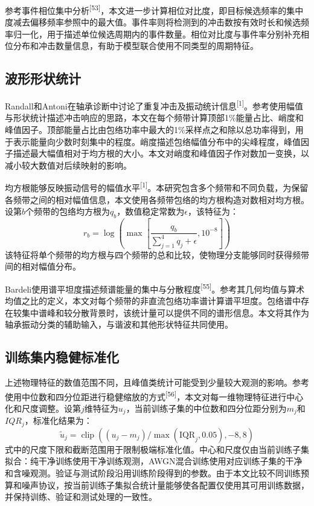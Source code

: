\documentclass[UTF8,12pt,openany,twoside]{ctexbook}
\numberwithin{equation}{chapter}
\begin{document}
参考事件相位集中分析\textsuperscript{[53]}，本文进一步计算相位对比度，即目标候选频率的集中度减去偏移频率参照中的最大值。事件率则将检测到的冲击数按有效时长和候选频率归一化，用于描述单位候选周期内的事件数量。相位对比度与事件率分别补充相位分布和冲击数量信息，有助于模型联合使用不同类型的周期特征。

\subsection{波形形状统计}\label{ux6ce2ux5f62ux5f62ux72b6ux7edfux8ba1}


Randall和Antoni在轴承诊断中讨论了重复冲击及振动统计信息\textsuperscript{[1]}。参考使用幅值与形状统计描述冲击响应的思路，本文在每个频带计算顶部1\%能量占比、峭度和峰值因子。顶部能量占比由包络功率中最大的1\%采样点之和除以总功率得到，用于表示能量向少数时刻集中的程度。峭度描述包络幅值分布中的尖峰程度，峰值因子描述最大幅值相对于均方根的大小。本文对峭度和峰值因子作对数加一变换，以减小较大数值对后续映射的影响。

均方根能够反映振动信号的幅值水平\textsuperscript{[1]}。本研究包含多个频带和不同负载，为保留各频带之间的相对幅值信息，本文使用各频带包络的均方根构造对数相对均方根。设第$b$个频带的包络均方根为$q_b$，数值稳定常数为$\epsilon$，该特征为：
\begin{equation}
\label{eq:auto07}
r_b=\log\!\left(\max\!\left[\frac{q_b}{\sum_{j=1}^{4}q_j+\epsilon},10^{-8}\right]\right)
\end{equation}
该特征将单个频带的均方根与四个频带的总和比较，使物理分支能够同时获得频带间的相对幅值分布。

Bardeli使用谱平坦度描述频谱能量的集中与分散程度\textsuperscript{[55]}。参考其几何均值与算术均值之比的定义，本文对每个频带的非直流包络功率谱计算谱平坦度。包络谱中存在较集中谱峰和较分散背景时，该统计量可以提供不同的谱形信息。本文将其作为轴承振动分类的辅助输入，与谐波和其他形状特征共同使用。

\subsection{训练集内稳健标准化}\label{ux8badux7ec3ux96c6ux5185ux7a33ux5065ux6807ux51c6ux5316}


上述物理特征的数值范围不同，且峰值类统计可能受到少量较大观测的影响。参考使用中位数和四分位距进行稳健缩放的方式\textsuperscript{[56]}，本文对每一维物理特征进行中心化和尺度调整。设第$j$维特征为$u_j$，当前训练子集的中位数和四分位距分别为$m_j$和$IQR_j$，标准化结果为：
\begin{equation}
\label{eq:auto08}
\tilde u_j=\operatorname{clip}\left((u_j-m_j)/\max(\mathrm{IQR}_j,0.05),-8,8\right)
\end{equation}
式中的尺度下限和截断范围用于限制极端标准化值。中心和尺度仅由当前训练子集拟合：纯干净训练使用干净训练观测，AWGN混合训练使用对应训练子集的干净和含噪观测。验证与测试阶段沿用训练阶段得到的参数。由于本文比较不同训练预算和噪声协议，按当前训练子集拟合统计量能够使各配置仅使用其可用训练数据，并保持训练、验证和测试处理的一致性。
\end{document}
